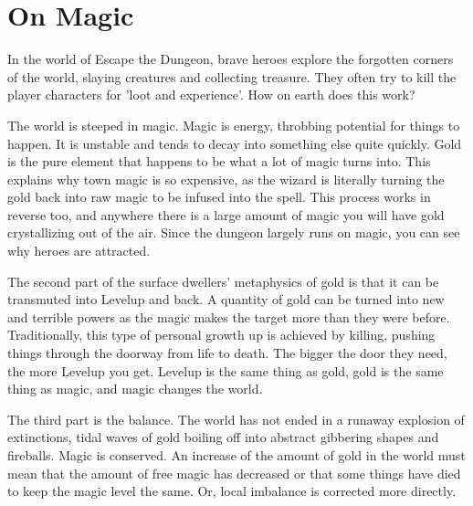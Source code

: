 \documentclass{tufte-book}
\begin{document}
\chapter{On Magic}

In the world of Escape the Dungeon, brave heroes explore the forgotten corners of the world, slaying creatures and collecting treasure.  They often try to kill the player characters for 'loot and experience'. How on earth does this work?

The world is steeped in magic. Magic is energy, throbbing potential for things to happen. It is unstable and tends to decay into something else quite quickly. Gold is the pure element that happens to be what a lot of magic turns into. This explains why town magic is so expensive, as the wizard is literally turning the gold back into raw magic to be infused into the spell. This process works in reverse too, and anywhere there is a large amount of magic you will have gold crystallizing out of the air. Since the dungeon largely runs on magic, you can see why heroes are attracted.

The second part of the surface dwellers' metaphysics of gold is that it can be transmuted into Levelup and back. A quantity of gold can be turned into new and terrible powers as the magic makes the target more than they were before. Traditionally, this type of personal growth up is achieved by killing, pushing things through the doorway from life to death. The bigger the door they need, the more Levelup you get. Levelup is the same thing as gold, gold is the same thing as magic, and magic changes the world.

The third part is the balance. The world has not ended in a runaway explosion of extinctions, tidal waves of gold boiling off into abstract gibbering shapes and fireballs. Magic is conserved. An increase of the amount of gold in the world must mean that the amount of free magic has decreased or that some things have died to keep the magic level the same. Or, local imbalance is corrected more directly.
\end{document}
